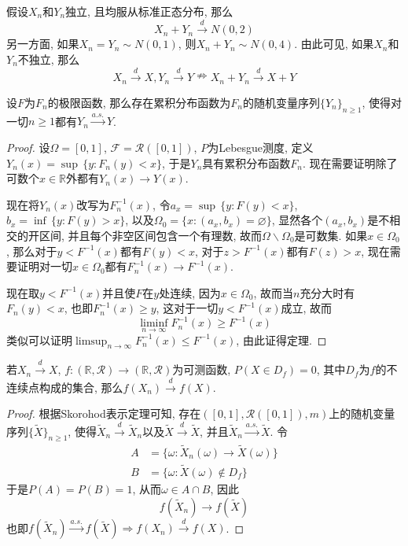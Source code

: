 \documentclass[cn, 12pt, math=mtpro2, bibstyle=apa, blue, twocol]{elegantbook}
\newcommand{\F}{\mathcal{F}}
\newcommand{\R}{\mathbb{R}}
\let\emptyset\varnothing
\begin{document}
\begin{example}
假设$X_n$和$Y_n$独立, 且均服从标准正态分布, 那么
$$X_n+Y_n\xrightarrow{d} N(0,2)$$
另一方面, 如果$X_n=Y_n\sim N(0,1)$, 则$X_n+Y_n\sim N(0,4)$. 由此可见, 如果$X_n$和$Y_n$不独立, 那么
$$X_n\xrightarrow{d}X, Y_n\xrightarrow{d}Y \nRightarrow X_n+Y_n\xrightarrow{d} X+Y$$

\end{example}

\begin{theorem}[Skorohod表示定理]\label{thm:thm3.2}
  设$F$为$F_n$的极限函数, 那么存在累积分布函数为$F_n$的随机变量序列$\{Y_n\}_{n\ge1}$, 使得对一切$n\ge1$都有$Y_n\xrightarrow{a.s.}Y$.
\end{theorem}
\begin{proof}
  设$\Omega=[0,1]$, $\F=\mathcal{R}([0,1])$, $P$为Lebesgue测度, 定义$Y_n(x)=\sup\,\{y: F_n(y)<x\}$, 于是$Y_n$具有累积分布函数$F_n$. 现在需要证明除了可数个$x\in\R$外都有$Y_n(x)\to Y(x)$.

  现在将$Y_n(x)$改写为$F_n^{-1}(x)$, 令$a_x=\sup\,\{y: F(y)<x\}$, $b_x=\inf\,\{y: F(y)>x\}$, 以及$\Omega_0=\{x: (a_x,b_x)=\emptyset\}$, 显然各个$(a_x,b_x)$是不相交的开区间, 并且每个非空区间包含一个有理数, 故而$\Omega\backslash\Omega_0$是可数集. 如果$x\in\Omega_0$, 那么对于$y<F^{-1}(x)$都有$F(y)<x$, 对于$z>F^{-1}(x)$都有$F(z)>x$, 现在需要证明对一切$x\in\Omega_0$都有$F_n^{-1}(x)\to F^{-1}(x)$.

  现在取$y<F^{-1}(x)$并且使$F$在$y$处连续, 因为$x\in\Omega_0$, 故而当$n$充分大时有$F_n(y)<x$, 也即$F_n^{-1}(x)\geq y$, 这对于一切$y<F^{-1}(x)$成立, 故而$$\liminf_{n\to\infty}F_n^{-1}(x)\geq F^{-1}(x)$$
  类似可以证明$\limsup_{n\to\infty}F_n^{-1}(x)\leq F^{-1}(x)$, 由此证得定理.
\end{proof}

\begin{theorem}[连续映射定理]
  若$X_n\xrightarrow{d}X$, $f:(\R,\mathcal{R})\to(\R,\mathcal{R})$为可测函数, $P(X\in D_f)=0$, 其中$D_f$为$f$的不连续点构成的集合, 那么$f(X_n)\xrightarrow{d}f(X)$.
\end{theorem}
\begin{proof}
  根据Skorohod表示定理可知, 存在$([0,1],\mathcal{R}([0,1]),m)$上的随机变量序列$\{\tilde{X}\}_{n\ge1}$, 使得$\tilde{X}_n\xrightarrow{d}\tilde{X}_n$以及$\tilde{X}\xrightarrow{d}\tilde{X}$, 并且$\tilde{X}_n\xrightarrow{a.s.}\tilde{X}$. 令
  \begin{align*}
  A&=\{\omega: \tilde{X}_n(\omega)\to\tilde{X}(\omega)\}\\
  B&=\{\omega:\tilde{X}(\omega)\notin D_f\}
  \end{align*}
  于是$P(A)=P(B)=1$, 从而$\omega\in A\cap B$, 因此
  $$f(\tilde{X}_n)\to f(\tilde{X})$$
  也即$f(\tilde{X}_n)\xrightarrow{a.s.}f(\tilde{X})\Rightarrow f(X_n)\xrightarrow{d} f(X)$.
\end{proof}
\end{document}
